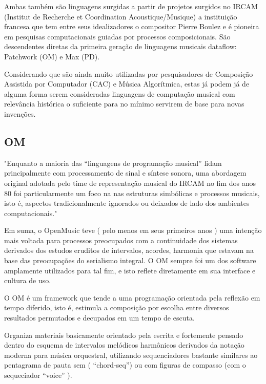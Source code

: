 \documentclass[
	12pt,				%
	openright,			%
	twoside,			%
	a4paper,			%
	english,			%
	french,				%
	spanish,			%
	brazil				%
	]{abntex2}
\begin{document}
Ambas também são linguagens surgidas a partir de projetos surgidos no IRCAM (Institut de Recherche et Coordination Acoustique/Musique) a instituição francesa que tem entre seus idealizadores o compositor Pierre Boulez e é pioneira em pesquisas computacionais guiadas por processos composicionais. São descendentes diretas da primeira geração de linguagens musicais dataflow: Patchwork (OM) e Max (PD).

Considerando que são ainda muito utilizadas por pesquisadores de Composição Assistida por Computador (CAC) e Música Algorítmica, estas já podem já de alguma forma serem consideradas linguagens de computação musical com relevância histórica o suficiente para no mínimo servirem de base para novas invenções.




\subsection{OM}

\begin{citacao}
"Enquanto a maioria das “linguagens de programação musical” lidam principalmente com processamento de sinal e síntese
sonora, uma abordagem original adotada pelo time de representação musical do IRCAM no fim dos anos 80 foi
particularmente um foco na nas estruturas simbólicas e processos musicais, isto é, aspectos tradicionalmente
ignorados ou deixados de lado dos ambientes computacionais."\cite{bresson2011openmusic}
\end{citacao}

Em suma, o OpenMusic teve ( pelo menos em seus primeiros anos ) uma intenção mais voltada para processos preocupados com a continuidade dos sistemas derivados dos estudos eruditos de intervalos, acordes, harmonia que estavam na base das preocupações do serialismo integral. O OM sempre foi um dos software amplamente utilizados para tal fim, e isto reflete diretamente em sua interface e cultura de uso.


O OM é um framework que tende a uma programação orientada pela reflexão em tempo diferido, isto é, estimula a composição por escolha entre diversos resultados permutados e decupados em um tempo de escuta.

Organiza materiais basicamente orientado pela escrita e fortemente pensado dentro do esquema de intervalos melódicos
harmônicos derivados da notação moderna para música orquestral, utilizando sequenciadores bastante similares ao pentagrama de pauta sem ( “chord-seq”) ou com figuras de compasso (com o sequeciador “voice” ).
\end{document}
